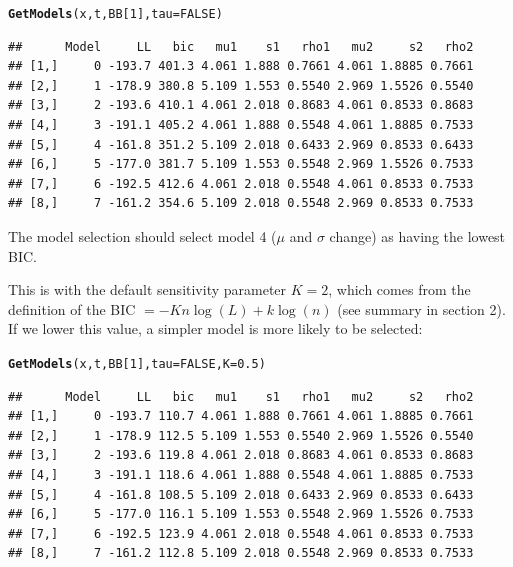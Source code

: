 \documentclass[10pt]{article}\usepackage[]{graphicx}\usepackage[]{color}
\makeatletter
\newcommand{\hlnum}[1]{\textcolor[rgb]{0.686,0.059,0.569}{#1}}%
\newcommand{\hlstd}[1]{\textcolor[rgb]{0.345,0.345,0.345}{#1}}%
\newcommand{\hlkwc}[1]{\textcolor[rgb]{0.333,0.667,0.333}{#1}}%
\newcommand{\hlkwd}[1]{\textcolor[rgb]{0.737,0.353,0.396}{\textbf{#1}}}%
\newenvironment{kframe}{%
 \def\at@end@of@kframe{}%
 \ifinner\ifhmode%
  \def\at@end@of@kframe{\end{minipage}}%
  \begin{minipage}{\columnwidth}%
 \fi\fi%
 \def\FrameCommand##1{\hskip\@totalleftmargin \hskip-\fboxsep
 \colorbox{shadecolor}{##1}\hskip-\fboxsep
     \hskip-\linewidth \hskip-\@totalleftmargin \hskip\columnwidth}%
 \MakeFramed {\advance\hsize-\width
   \@totalleftmargin\z@ \linewidth\hsize
   \@setminipage}}%
 {\par\unskip\endMakeFramed%
 \at@end@of@kframe}
\newenvironment{knitrout}{}{} %
\makeatother
\begin{document}
\begin{knitrout}
\color{fgcolor}\begin{kframe}
\begin{alltt}
\hlkwd{GetModels}\hlstd{(x, t, BB[}\hlnum{1}\hlstd{],} \hlkwc{tau} \hlstd{=} \hlnum{FALSE}\hlstd{)}
\end{alltt}
\begin{verbatim}
##      Model     LL   bic   mu1    s1   rho1   mu2     s2   rho2
## [1,]     0 -193.7 401.3 4.061 1.888 0.7661 4.061 1.8885 0.7661
## [2,]     1 -178.9 380.8 5.109 1.553 0.5540 2.969 1.5526 0.5540
## [3,]     2 -193.6 410.1 4.061 2.018 0.8683 4.061 0.8533 0.8683
## [4,]     3 -191.1 405.2 4.061 1.888 0.5548 4.061 1.8885 0.7533
## [5,]     4 -161.8 351.2 5.109 2.018 0.6433 2.969 0.8533 0.6433
## [6,]     5 -177.0 381.7 5.109 1.553 0.5548 2.969 1.5526 0.7533
## [7,]     6 -192.5 412.6 4.061 2.018 0.5548 4.061 0.8533 0.7533
## [8,]     7 -161.2 354.6 5.109 2.018 0.5548 2.969 0.8533 0.7533
\end{verbatim}
\end{kframe}
\end{knitrout}

The model selection should select model 4 ($\mu$ and $\sigma$ change) as having the lowest BIC.  

This is with the default sensitivity parameter $K=2$, which comes from the definition of the BIC $= -Kn \log(L) + k \log(n)$ (see summary in section 2).  If we lower this value, a simpler model is more likely to be selected:
\begin{knitrout}
\color{fgcolor}\begin{kframe}
\begin{alltt}
\hlkwd{GetModels}\hlstd{(x, t, BB[}\hlnum{1}\hlstd{],} \hlkwc{tau} \hlstd{=} \hlnum{FALSE}\hlstd{,} \hlkwc{K} \hlstd{=} \hlnum{0.5}\hlstd{)}
\end{alltt}
\begin{verbatim}
##      Model     LL   bic   mu1    s1   rho1   mu2     s2   rho2
## [1,]     0 -193.7 110.7 4.061 1.888 0.7661 4.061 1.8885 0.7661
## [2,]     1 -178.9 112.5 5.109 1.553 0.5540 2.969 1.5526 0.5540
## [3,]     2 -193.6 119.8 4.061 2.018 0.8683 4.061 0.8533 0.8683
## [4,]     3 -191.1 118.6 4.061 1.888 0.5548 4.061 1.8885 0.7533
## [5,]     4 -161.8 108.5 5.109 2.018 0.6433 2.969 0.8533 0.6433
## [6,]     5 -177.0 116.1 5.109 1.553 0.5548 2.969 1.5526 0.7533
## [7,]     6 -192.5 123.9 4.061 2.018 0.5548 4.061 0.8533 0.7533
## [8,]     7 -161.2 112.8 5.109 2.018 0.5548 2.969 0.8533 0.7533
\end{verbatim}
\end{kframe}
\end{knitrout}
\end{document}
